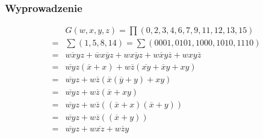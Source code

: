 \documentclass[a4paper,12pt]{extarticle}  %
\begin{document}
\subsubsection{Wyprowadzenie}
\begin{align}
	  & G(w,x,y,z) = \prod(0, 2, 3, 4, 6, 7, 9, 11, 12, 13, 15)                                                       \\
	= & \sum(1,5,8,14) = \sum(0001, 0101, 1000, 1010, 1110)                                                           \\
	= & \overline{wxy}z + \overline{w}x\overline{y}z + w\overline{xyz} + w\overline{x}y\overline{z} + wxy\overline{z} \\
	= & \overline{wy}z(\overline{x} + x) + w\overline{z}(\overline{xy} + \overline{x}y + xy)                          \\
	= & \overline{wy}z + w\overline{z}(\overline{x}(\overline{y} + y) + xy)                                           \\
	= & \overline{wy}z + w\overline{z}(\overline{x} + xy)                                                             \\
	= & \overline{wy}z + w\overline{z}((\overline{x} + x)(\overline{x} + y))                                          \\
	= & \overline{wy}z + w\overline{z}((\overline{x} + y))                                                            \\
	= & \overline{wy}z + w\overline{xz} + w\overline{z}y
\end{align}
\end{document}
